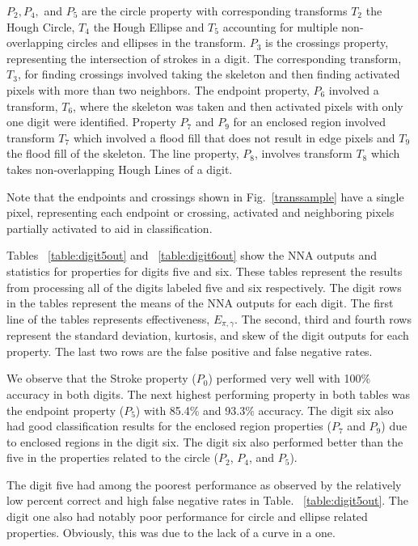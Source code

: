 \documentclass[conference]{IEEEtran}
\begin{document}
$P_2, P_4,$ and $P_5$ are the circle property with corresponding transforms $T_2$ the Hough Circle, $T_4$ the Hough Ellipse and $T_5$ accounting for multiple non-overlapping circles and ellipses in the transform.  $P_3$ is the crossings property, representing the intersection of strokes in a digit.  The corresponding transform, $T_3$, for finding crossings involved taking the skeleton and then finding activated pixels with more than two neighbors.   The endpoint property, $P_6$ involved a transform, $T_6$, where the skeleton was taken and then activated pixels with only one digit were identified.  Property $P_7$ and $P_9$ for an enclosed region involved transform $T_7$ which involved a flood fill that does not result in edge pixels and $T_9$ the flood fill of the skeleton.  The line property, $P_8$, involves transform $T_8$ which takes non-overlapping Hough Lines of a digit.

Note that the endpoints and crossings shown in Fig.~\ref{transsample} have a single pixel, representing each endpoint or crossing, activated and neighboring pixels partially activated to aid in classification.

Tables ~\ref{table:digit5out} and ~\ref{table:digit6out} show the NNA outputs and statistics for properties for digits five and six.  These tables represent the results from processing all of the digits labeled five and six respectively.   The digit rows in the tables represent the means of the NNA outputs for each digit.  The first line of the tables represents effectiveness, $E_{\pi,\gamma}$.  The second, third and fourth rows represent the standard deviation, kurtosis, and skew of the digit outputs for each property.  The last two rows are the false positive and false negative rates.

We observe that the Stroke property ($P_0$) performed very well with 100\% accuracy in both digits.  The next highest performing property in both tables was the endpoint property ($P_5$) with 85.4\% and 93.3\% accuracy.  The digit six also had good classification results for the enclosed region properties ($P_7$ and $P_9$) due to enclosed regions in the digit six.  The digit six also performed better than the five in the properties related to the circle ($P_2$, $P_4$, and $P_5$).

The digit five had among the poorest performance as observed by the relatively low percent correct and high false negative rates in Table. ~\ref{table:digit5out}.  The digit one also had notably poor performance for circle and ellipse related properties.  Obviously, this was due to the lack of a curve in a one.
\end{document}
